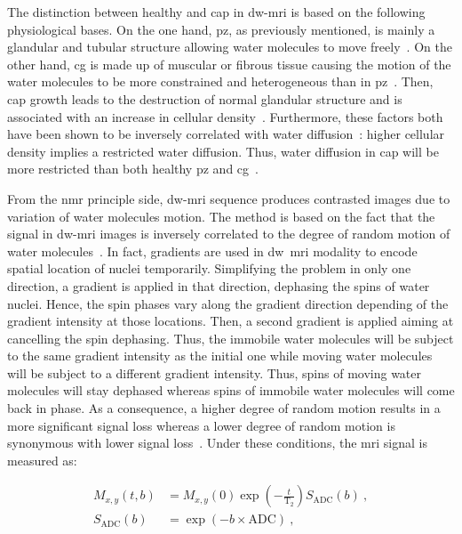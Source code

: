 The distinction between healthy and \ac{cap} in \ac{dw}-\ac{mri} is based on
the following physiological bases.
On the one hand, \ac{pz}, as previously mentioned, is mainly a glandular and
tubular structure allowing water molecules to move
freely~\cite{Choi2007,Hoeks2011}.
On the other hand, \ac{cg} is made up of muscular or fibrous tissue causing the
motion of the water molecules to be more constrained and heterogeneous than in
\ac{pz}~\cite{Hoeks2011}.
Then, \ac{cap} growth leads to the destruction of normal glandular structure
and is associated with an increase in cellular
density~\cite{Hoeks2011,Koh2007,Somford2008}.
Furthermore, these factors both have been shown to be inversely correlated with
water diffusion~\cite{Koh2007,Somford2008}: higher cellular density implies a
restricted water diffusion.
Thus, water diffusion in \ac{cap} will be more restricted than both healthy
\ac{pz} and \ac{cg}~\cite{Koh2007,Hoeks2011}.

From the \ac{nmr} principle side, \ac{dw}-\ac{mri} sequence produces contrasted
images due to variation of water molecules motion.
The method is based on the fact that the signal in \ac{dw}-\ac{mri} images is
inversely correlated to the degree of random motion of water
molecules~\cite{Huisman2003}.
In fact, gradients are used in \ac{dw}~\ac{mri} modality to encode spatial
location of nuclei temporarily.
Simplifying the problem in only one direction, a gradient is applied in that
direction, dephasing the spins of water nuclei.
Hence, the spin phases vary along the gradient direction depending of the
gradient intensity at those locations.
Then, a second gradient is applied aiming at cancelling the spin dephasing.
Thus, the immobile water molecules will be subject to the same gradient
intensity as the initial one while moving water molecules will be subject to a
different gradient intensity.
Thus, spins of moving water molecules will stay dephased whereas spins of
immobile water molecules will come back in phase.
As a consequence, a higher degree of random motion results in a more
significant signal loss whereas a lower degree of random motion is synonymous
with lower signal loss~\cite{Huisman2003}.
Under these conditions, the \ac{mri} signal is measured as:

\begin{align}
  M_{x,y}\left(t,b\right) & = M_{x,y}(0) \exp \left( - \frac{t}{\text{T}_2} \right) S_{\text{ADC}}(b) \ , \label{eq:t2dif} \\
  S_{\text{ADC}}(b) & = \exp \left( -b \times \text{ADC} \right) \ , \label{eq:dif}
\end{align}

